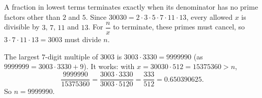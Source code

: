 A fraction in lowest terms terminates exactly when its denominator has no prime factors other than $2$ and $5$. Since $30030=2\cdot3\cdot5\cdot7\cdot11\cdot13$, every allowed $x$ is divisible by $3$, $7$, $11$ and $13$. For $\dfrac nx$ to terminate, these primes must cancel, so $3\cdot7\cdot11\cdot13=3003$ must divide $n$.

The largest $7$-digit multiple of $3003$ is $3003\cdot3330=9999990$ (as $9999999=3003\cdot3330+9$). It works: with $x=30030\cdot512=15375360>n$,
\[\dfrac{9999990}{15375360}=\dfrac{3003\cdot3330}{3003\cdot5120}=\dfrac{333}{512}=0.650390625.\]
So $n=\boxed{9999990}$.
